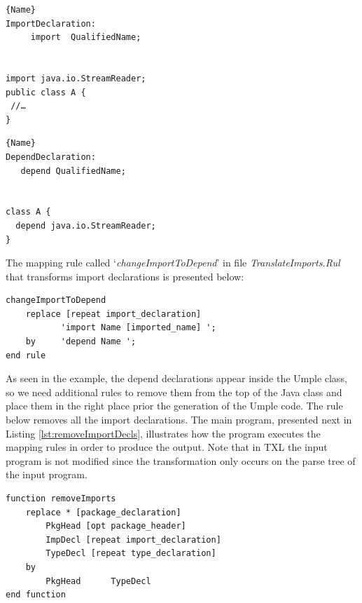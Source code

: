\noindent\begin{minipage}{.45\textwidth}
\begin{lstlisting}[style=umplePlain,caption=Java Import]{Name}
ImportDeclaration:
     import  QualifiedName; 


import java.io.StreamReader;
public class A {
 //…
}
\end{lstlisting}
\end{minipage}\hfill
\begin{minipage}{.45\textwidth}
\begin{lstlisting}[style=umplePlain,caption=Umple Depend]{Name}
DependDeclaration:
   depend QualifiedName;


class A {
  depend java.io.StreamReader;
}
\end{lstlisting}
\end{minipage}

The mapping rule called `\textit{changeImportToDepend}' in file \textit{TranslateImports.Rul} that transforms import declarations is presented below: 

\begin{lstlisting}[style=umplePlain, label=lst:packageDeclRule, caption=TXL mapping rule for the transformation of the import declaration] 
changeImportToDepend  	
    replace [repeat import_declaration]      
           'import Name [imported_name] '; 
    by 	   'depend Name '; 
end rule
\end{lstlisting}

As seen in the example, the depend declarations appear inside the Umple class, so we need additional rules to remove them from the top of the Java class and place them in the right place prior the generation of the Umple code. The rule below removes all the import declarations. The main program, presented next in Listing \ref{lst:removeImportDecls}, illustrates how the program executes the mapping rules in order to produce the output. Note that in TXL the input program is not modified since the transformation only occurs on the parse tree of the input program.

\begin{lstlisting}[style=umplePlain, label=lst:removeImportDecls, caption=Helper Function used to remove the imports declarations] 
function removeImports  
    replace * [package_declaration]
        PkgHead [opt package_header]   
        ImpDecl [repeat import_declaration]  
        TypeDecl [repeat type_declaration] 
    by   
        PkgHead      TypeDecl
end function
\end{lstlisting}


